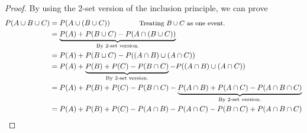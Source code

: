 \documentclass[11pt]{article}
\begin{document}
\begin{enumerate}
\begin{enumerate}
\begin{mdframed}
						\begin{proof} By using the 2-set version of the inclusion principle, we can prove
							\begin{align*}
								P(A \cup B \cup C) &= P(A \cup (B \cup C))	\qquad\qquad\text{{\small Treating $ B \cup C $ as one event.}}\\
								&= \underbrace{P(A) + P(B \cup C) - P(A \cap (B \cup C))}_{\text{By 2-set version.}}\\
								&= P(A) + P(B \cup C) - P((A \cap B) \cup (A \cap C))\\
								&= P(A) + \underbrace{P(B) + P(C) - P(B \cap C)}_{\text{By 2-set version.}} - P((A \cap B) \cup (A \cap C))\\
								&= P(A) + P(B) + P(C) - P(B \cap C) - \underbrace{P(A \cap B) + P(A \cap C) - P(A \cap B \cap C)}_{\text{By 2-set version.}}\\
								&= P(A) + P(B) + P(C) - P(A \cap B) - P(A \cap C) - P(B \cap C) + P(A \cap B \cap C) \qedhere
							\end{align*}
						\end{proof}
					\end{mdframed}
			\end{enumerate}


\end{enumerate}
\end{document}
